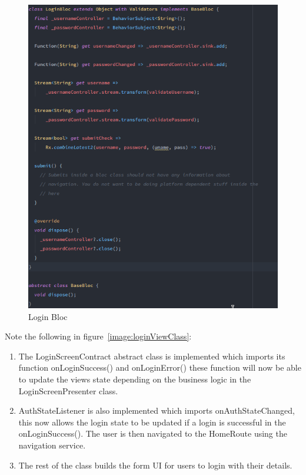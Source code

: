 \begin{figure}[h!]
    \caption{Login Bloc}
    \label{image:loginBloc}
    \centering
    \includegraphics[width=1.0\textwidth]{images/login_bloc.png}
\end{figure}

Note the following in figure~\ref{image:loginViewClass}:
\begin{enumerate}
    \item The LoginScreenContract abstract class is implemented which imports its function onLoginSuccess() and onLoginError() these function will now be able to update the views state depending on the business logic in the LoginScreenPresenter class.
    \item AuthStateListener is also implemented which imports onAuthStateChanged, this now allows the login state to be updated if a login is successful in the onLoginSuccess(). The user is then navigated to the HomeRoute using the navigation service.
    \item The rest of the class builds the form UI for users to login with their details.
\end{enumerate}

